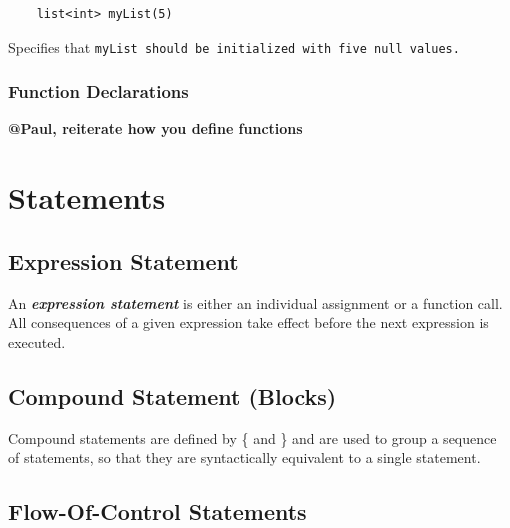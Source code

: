 \documentclass{article}
\begin{document}
\begin{verbatim}
    list<int> myList(5)
\end{verbatim}

Specifies that \tt myList \rm should be initialized with five \tt null \rm values.


\subsubsection{Function Declarations} %
\label{ssub:function_declarations}

\textbf{@Paul, reiterate how you define functions}




\section{Statements} %
\label{sec:statements}

\subsection{Expression Statement} %
\label{sub:expression_statement}

An \textbf{\emph{expression statement}} is either an individual assignment or a function call. All consequences of a given
expression take effect before the next expression is executed.


\subsection{Compound Statement (Blocks)} %
\label{sub:compound_statement}

Compound statements are defined by \{ and \} and are used to group a sequence of
statements, so that they are syntactically equivalent to a single statement.


\subsection{Flow-Of-Control Statements} %
\label{sub:flow_of_control_statements}
\end{document}
